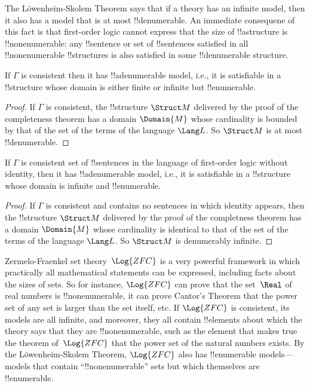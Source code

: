 \documentclass[../../../include/open-logic-section]{subfiles}
\begin{document}

The L\"owenheim-Skolem Theorem says that if a theory has an infinite
model, then it also has a model that is at most !!{denumerable}. An
immediate consequene of this fact is that first-order logic cannot
express that the size of !!a{structure} is !!{nonenumerable}: any
!!{sentence} or set of !!{sentence}s satisfied in all
!!{nonenumerable} !!{structure}s is also satisfied in some
!!{denumerable} structure.

\begin{thm} 
 If $\Gamma$ is consistent then it has
!!a{denumerable} model, i.e., it is satisfiable in a !!{structure}
whose domain is either finite or infinite but !!{enumerable}.
\end{thm}

\begin{proof}
If $\Gamma$ is consistent, the !!{structure} $\Struct M$ delivered by
the proof of the completeness theorem has a domain $\Domain{M}$ whose
cardinality is bounded by that of the set of the terms of the language
$\Lang L$. So $\Struct M$ is at most !!{denumerable}.
\end{proof}

\begin{thm}
 If $\Gamma$ is consistent set of !!{sentence}s
in the language of first-order logic without identity, then it has
!!a{denumerable} model, i.e., it is satisfiable in a !!{structure}
whose domain is infinite and !!{enumerable}.
\end{thm}

\begin{proof}
If $\Gamma$ is consistent and contains no sentences in which identity
appears, then the !!{structure} $\Struct M$ delivered by the proof of
the completness theorem has a domain $\Domain{M}$ whose cardinality is
identical to that of the set of the terms of the language $\Lang
L$. So $\Struct M$ is denumerably infinite.
\end{proof}

\begin{ex}
Zermelo-Fraenkel set theory~$\Log{ZFC}$ is a very powerful framework
in which practically all mathematical statements can be expressed,
including facts about the sizes of sets. So for instance, $\Log{ZFC}$
can prove that the set~$\Real$ of real numbers is !!{nonenumerable},
it can prove Cantor's Theorem that the power set of any set is larger
than the set itself, etc.  If $\Log{ZFC}$ is consistent, its models
are all infinite, and moreover, they all contain !!{element}s about
which the theory says that they are !!{nonenumerable}, such as the
element that makes true the theorem of~$\Log{ZFC}$ that the power set
of the natural numbers exists. By the L\"owenheim-Skolem Theorem,
$\Log{ZFC}$ also has !!{enumerable} models---models that contain
``!!{nonenumerable}'' sets but which themselves are !!{enumerable}.
\end{ex}
\end{document}

